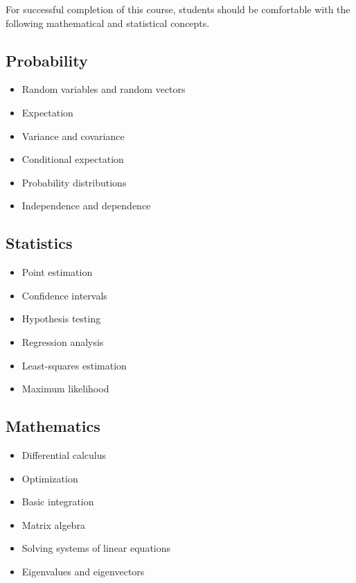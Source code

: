 \documentclass[11pt]{article}
\begin{document}
For successful completion of this course, students should be comfortable
with the following mathematical and statistical concepts.

\subsection{Probability}

\begin{itemize}
    \item Random variables and random vectors
    \item Expectation
    \item Variance and covariance
    \item Conditional expectation
    \item Probability distributions
    \item Independence and dependence
\end{itemize}

\subsection{Statistics}

\begin{itemize}
    \item Point estimation
    \item Confidence intervals
    \item Hypothesis testing
    \item Regression analysis
    \item Least-squares estimation
    \item Maximum likelihood
\end{itemize}

\subsection{Mathematics}

\begin{itemize}
    \item Differential calculus
    \item Optimization
    \item Basic integration
    \item Matrix algebra
    \item Solving systems of linear equations
    \item Eigenvalues and eigenvectors
\end{itemize}
\end{document}
